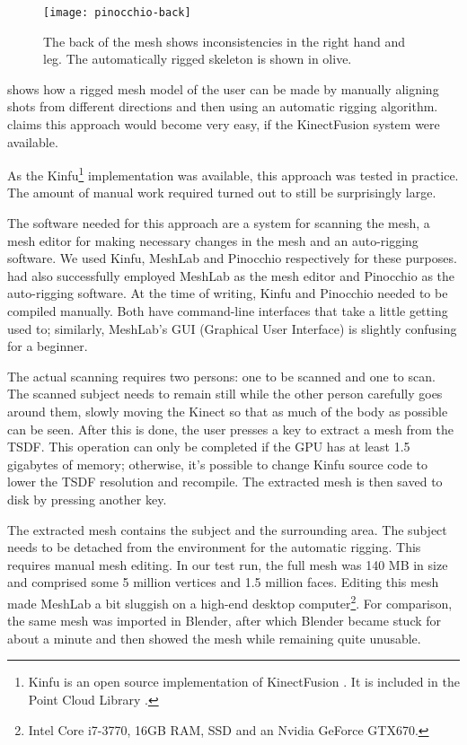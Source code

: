 \begin{figure}
    \centering
    \texttt{[image: pinocchio-back]}
    \caption{The back of the mesh shows inconsistencies in the right hand and leg. The automatically rigged skeleton is shown in olive.}
    \label{fig:hannu-back}
\end{figure}

\citet{charpentier2011accurate} shows how a rigged mesh model of the user can be made by manually aligning shots from different directions and then using an automatic rigging algorithm. \citeauthor{charpentier2011accurate} claims this approach would become very easy, if the KinectFusion system were available.

As the Kinfu\footnote{Kinfu is an open source implementation of KinectFusion \citep{newcombe2011kinectfusion}. It is included in the Point Cloud Library \citep{PCL}.} implementation was available, this approach was tested in practice. The amount of manual work required turned out to still be surprisingly large.

The software needed for this approach are a system for scanning the mesh, a mesh editor for making necessary changes in the mesh and an auto-rigging software. We used Kinfu, MeshLab and Pinocchio respectively for these purposes. \citet{charpentier2011accurate} had also successfully employed MeshLab as the mesh editor and Pinocchio as the auto-rigging software. At the time of writing, Kinfu and Pinocchio needed to be compiled manually. Both have command-line interfaces that take a little getting used to; similarly, MeshLab's GUI (Graphical User Interface) is slightly confusing for a beginner.

The actual scanning requires two persons: one to be scanned and one to scan. The scanned subject needs to remain still while the other person carefully goes around them, slowly moving the Kinect so that as much of the body as possible can be seen. After this is done, the user presses a key to extract a mesh from the TSDF. This operation can only be completed if the GPU has at least 1.5 gigabytes of memory; otherwise, it's possible to change Kinfu source code to lower the TSDF resolution and recompile. The extracted mesh is then saved to disk by pressing another key.

The extracted mesh contains the subject and the surrounding area. The subject needs to be detached from the environment for the automatic rigging. This requires manual mesh editing. In our test run, the full mesh was 140 MB in size and comprised some 5 million vertices and 1.5 million faces. Editing this mesh made MeshLab a bit sluggish on a high-end desktop computer\footnote{Intel Core i7-3770, 16GB RAM, SSD and an Nvidia GeForce GTX670.}. For comparison, the same mesh was imported in Blender, after which Blender became stuck for about a minute and then showed the mesh while remaining quite unusable.

